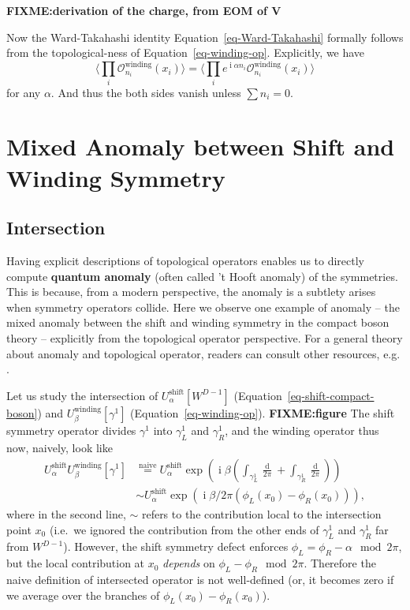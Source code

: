 \documentclass[11pt,toc=bibliography]{scrbook}
\DeclareMathOperator{\imunit}{i}
\newcommand{\stdim}{D}
\numberwithin{equation}{section}
\DeclareMathOperator{\imunit}{i}
\newcommand{\stdim}{D}
\begin{document}
\textbf{FIXME:derivation of the charge, from EOM of V}

Now the Ward-Takahashi identity Equation~\ref{eq-Ward-Takahashi}
formally follows from the topological-ness of
Equation~\ref{eq-winding-op}. Explicitly, we have \[
\langle \prod_i \mathcal{O}^\text{winding}_{n_i}(x_i)\rangle 
=
\langle \prod_i e^{\imunit \alpha n_i} \mathcal{O}^\text{winding}_{n_i}(x_i)\rangle 
\] for any \(\alpha\). And thus the both sides vanish unless
\(\sum n_i = 0\).

\section{Mixed Anomaly between Shift and Winding
Symmetry}\label{mixed-anomaly-between-shift-and-winding-symmetry}

\subsection{Intersection}\label{intersection}

Having explicit descriptions of topological operators enables us to
directly compute \textbf{quantum anomaly} (often called 't Hooft
anomaly) of the symmetries. This is because, from a modern perspective,
the anomaly is a subtlety arises when symmetry operators collide. Here
we observe one example of anomaly -- the mixed anomaly between the shift
and winding symmetry in the compact boson theory -- explicitly from the
topological operator perspective. For a general theory about anomaly and
topological operator, readers can consult other resources, e.g.
\textcite{TachikawaTasi}.

Let us study the intersection of \(U_\alpha^\text{shift}[W^{\stdim-1}]\)
(Equation~\ref{eq-shift-compact-boson}) and
\(U_\beta^\text{winding}[\gamma^1]\) (Equation~\ref{eq-winding-op}).
\textbf{FIXME:figure} The shift symmetry operator divides \(\gamma^1\)
into \(\gamma^1_L\) and \(\gamma^1_R\), and the winding operator thus
now, naively, look like \[
\begin{aligned}
U^\text{shift}_\alpha U^\text{winding}_\beta[\gamma^1] &\stackrel{\text{naive}}{=} U^\text{shift}_\alpha \exp\left(\imunit\beta \left(\int_{\gamma^1_L}\frac{\mathop{d\phi_L}}{2\pi} + \int_{\gamma^1_R}\frac{\mathop{d\phi_R}}{2\pi}\right)\right)\\
& \sim U^\text{shift}_\alpha \exp\left(\imunit\beta/2\pi (\phi_L(x_0) - \phi_R(x_0)) \right),
\end{aligned}
\] where in the second line, \(\sim\) refers to the contribution local
to the intersection point \(x_0\) (i.e.~we ignored the contribution from
the other ends of \(\gamma^1_L\) and \(\gamma^1_R\) far from
\(W^{\stdim-1}\)). However, the shift symmetry defect enforces
\(\phi_L = \phi_R - \alpha \mod 2\pi\), but the local contribution at
\(x_0\) \emph{depends} on \(\phi_L-\phi_R \mod 2\pi\). Therefore the
naive definition of intersected operator is not well-defined (or, it
becomes zero if we average over the branches of
\(\phi_L(x_0) -\phi_R(x_0)\)).
\end{document}
